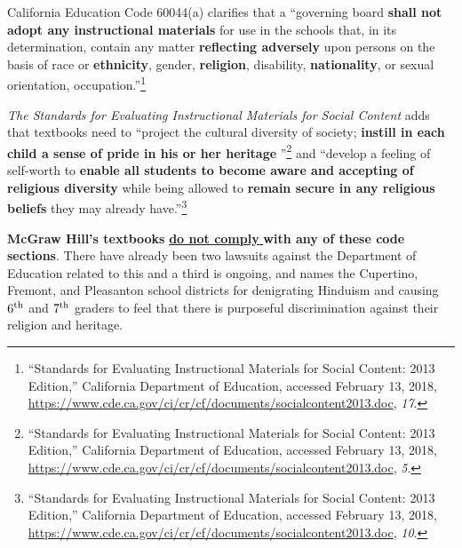 California Education Code 60044(a) clarifies that a “governing board \textbf{shall not adopt any instructional materials} for use in the schools that, in its determination, contain any matter \textbf{reflecting adversely} upon persons on the basis of race or \textbf{ethnicity}, gender, \textbf{religion}, disability, \textbf{nationality}, or sexual orientation, occupation.”\footnote{“Standards for Evaluating Instructional Materials for Social Content: 2013 Edition,” California Department of Education, accessed February 13, 2018, \url{https://www.cde.ca.gov/ci/cr/cf/documents/socialcontent2013.doc}, \textit{17}.}

\textit{The Standards for Evaluating Instructional Materials for Social Content} adds that textbooks need to “project the cultural diversity of society; \textbf{instill in each child a sense of pride in his or her heritage} ”\footnote{“Standards for Evaluating Instructional Materials for Social Content: 2013 Edition,” California Department of Education, accessed February 13, 2018, \url{https://www.cde.ca.gov/ci/cr/cf/documents/socialcontent2013.doc}, \textit{5}.} and “develop a feeling of self-worth to \textbf{enable all students to become aware and accepting of religious diversity} while being allowed to \textbf{remain secure in any religious beliefs} they may already have.”\footnote{“Standards for Evaluating Instructional Materials for Social Content: 2013 Edition,” California Department of Education, accessed February 13, 2018, \url{https://www.cde.ca.gov/ci/cr/cf/documents/socialcontent2013.doc}, \textit{10}.}

\textbf{McGraw Hill’s textbooks} \underline{\textbf{do not comply} } \textbf{with any of these code sections}. There have already been two lawsuits against the Department of Education related to this and a third is ongoing, and names the Cupertino, Fremont, and Pleasanton school districts for denigrating Hinduism and causing $6^{\rm th}$ and $7^{\rm th}$ graders to feel that there is purposeful discrimination against their religion and heritage.

